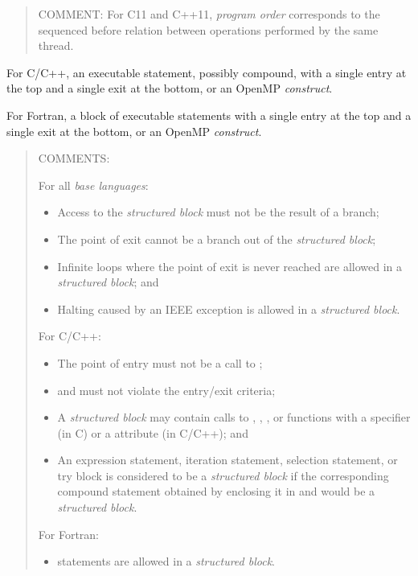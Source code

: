 \begin{quote}
COMMENT: For C11 and C++11, \emph{program order} corresponds to the sequenced
before relation between operations performed by the same thread.
\end{quote}
\glossarydefend

\glossarydefstart
For C/C++, an executable statement, possibly compound, with a single entry at the
top and a single exit at the bottom, or an OpenMP \emph{construct}.

For Fortran, a block of executable statements with a single entry at the top and a
single exit at the bottom, or an OpenMP \emph{construct}.

\begin{quote}
COMMENTS:

For all \emph{base languages}:

\begin{itemize}
\item Access to the \emph{structured block} must not be the result of a branch;

\item The point of exit cannot be a branch out of the \emph{structured block};

\item Infinite loops where the point of exit is never reached are
allowed in a \emph{structured block}; and

\item Halting caused by an IEEE exception is allowed in a \emph{structured block}.
\end{itemize}

For C/C++:

\begin{itemize}
\item The point of entry must not be a call to ;

\item {} and  must not violate the entry/exit criteria;

\item A \emph{structured block} may contain calls to ,
, ,  or functions
with a  specifier (in C) or a  attribute (in C/C++); and
  
\item An expression statement, iteration statement, selection statement,
or try block is considered to be a \emph{structured block} if the
corresponding compound statement obtained by enclosing it in \tcode{\{}
and \tcode{\}} would be a \emph{structured block}.
\end{itemize}

For Fortran:

\begin{itemize}
\item {} statements are allowed in a \emph{structured block}.
\end{itemize}
\end{quote}
\glossarydefend

